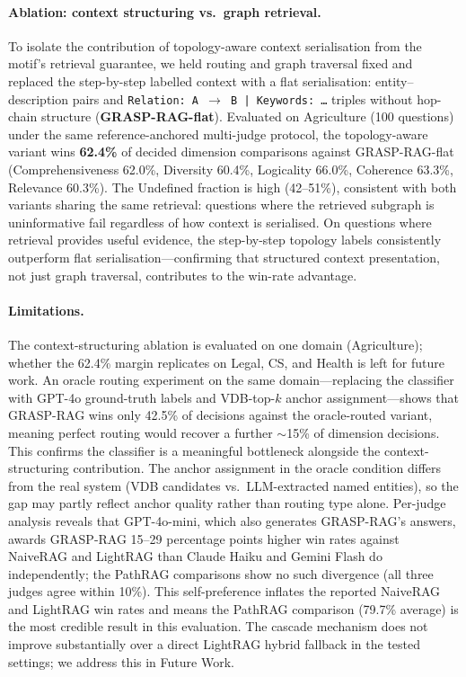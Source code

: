 \paragraph{Ablation: context structuring vs.\ graph retrieval.}
To isolate the contribution of topology-aware context serialisation from the
motif's retrieval guarantee, we held routing and graph traversal fixed and
replaced the step-by-step labelled context with a flat serialisation:
entity--description pairs and \texttt{Relation: A\,$\to$\,B | Keywords: \ldots}
triples without hop-chain structure (\textbf{GRASP-RAG-flat}).
Evaluated on Agriculture (100 questions) under the same reference-anchored
multi-judge protocol, the topology-aware variant wins \textbf{62.4\%} of
decided dimension comparisons against GRASP-RAG-flat (Comprehensiveness
62.0\%, Diversity 60.4\%, Logicality 66.0\%, Coherence 63.3\%, Relevance
60.3\%).
The Undefined fraction is high (42--51\%), consistent with both variants
sharing the same retrieval: questions where the retrieved subgraph is
uninformative fail regardless of how context is serialised.
On questions where retrieval provides useful evidence, the step-by-step
topology labels consistently outperform flat serialisation---confirming that
structured context presentation, not just graph traversal, contributes to the
win-rate advantage.

\paragraph{Limitations.}
The context-structuring ablation is evaluated on one domain (Agriculture);
whether the 62.4\% margin replicates on Legal, CS, and Health is left for
future work.
An oracle routing experiment on the same domain---replacing the classifier
with GPT-4o ground-truth labels and VDB-top-$k$ anchor assignment---shows
that GRASP-RAG wins only 42.5\% of decisions against the oracle-routed
variant, meaning perfect routing would recover a further $\sim$15\% of
dimension decisions.
This confirms the classifier is a meaningful bottleneck alongside the
context-structuring contribution.
The anchor assignment in the oracle condition differs from the real system
(VDB candidates vs.\ LLM-extracted named entities), so the gap may partly
reflect anchor quality rather than routing type alone.
Per-judge analysis reveals that GPT-4o-mini, which also generates GRASP-RAG's
answers, awards GRASP-RAG 15--29 percentage points higher win rates against
NaiveRAG and LightRAG than Claude Haiku and Gemini Flash do independently;
the PathRAG comparisons show no such divergence (all three judges agree
within 10\%).
This self-preference inflates the reported NaiveRAG and LightRAG win rates
and means the PathRAG comparison (79.7\% average) is the most credible
result in this evaluation.
The cascade mechanism does not improve substantially over a direct LightRAG
hybrid fallback in the tested settings; we address this in Future Work.
